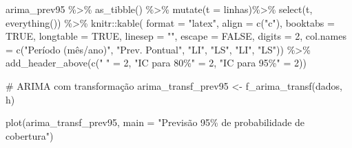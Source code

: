 \documentclass[
  letterpaper,
  DIV=11,
  numbers=noendperiod]{scrartcl}
\newenvironment{Shaded}{\begin{snugshade}}{\end{snugshade}}
\newcommand{\AttributeTok}[1]{\textcolor[rgb]{0.40,0.45,0.13}{#1}}
\newcommand{\CommentTok}[1]{\textcolor[rgb]{0.37,0.37,0.37}{#1}}
\newcommand{\ConstantTok}[1]{\textcolor[rgb]{0.56,0.35,0.01}{#1}}
\newcommand{\DecValTok}[1]{\textcolor[rgb]{0.68,0.00,0.00}{#1}}
\newcommand{\FunctionTok}[1]{\textcolor[rgb]{0.28,0.35,0.67}{#1}}
\newcommand{\NormalTok}[1]{\textcolor[rgb]{0.00,0.23,0.31}{#1}}
\newcommand{\OtherTok}[1]{\textcolor[rgb]{0.00,0.23,0.31}{#1}}
\newcommand{\SpecialCharTok}[1]{\textcolor[rgb]{0.37,0.37,0.37}{#1}}
\newcommand{\StringTok}[1]{\textcolor[rgb]{0.13,0.47,0.30}{#1}}
\begin{document}
\begin{Shaded}
\begin{Highlighting}[]
\NormalTok{arima\_prev95 }\SpecialCharTok{\%\textgreater{}\%} 
  \FunctionTok{as\_tibble}\NormalTok{() }\SpecialCharTok{\%\textgreater{}\%}
  \FunctionTok{mutate}\NormalTok{(}\AttributeTok{t =}\NormalTok{ linhas)}\SpecialCharTok{\%\textgreater{}\%}
  \FunctionTok{select}\NormalTok{(t, }\FunctionTok{everything}\NormalTok{()) }\SpecialCharTok{\%\textgreater{}\%}
\NormalTok{  knitr}\SpecialCharTok{::}\FunctionTok{kable}\NormalTok{(}
      \AttributeTok{format =} \StringTok{"latex"}\NormalTok{,}
      \AttributeTok{align =} \FunctionTok{c}\NormalTok{(}\StringTok{"c"}\NormalTok{),}
      \AttributeTok{booktabs =} \ConstantTok{TRUE}\NormalTok{,}
      \AttributeTok{longtable =} \ConstantTok{TRUE}\NormalTok{,}
      \AttributeTok{linesep =} \StringTok{""}\NormalTok{,}
      \AttributeTok{escape =} \ConstantTok{FALSE}\NormalTok{,}
      \AttributeTok{digits =} \DecValTok{2}\NormalTok{,}
      \AttributeTok{col.names =} \FunctionTok{c}\NormalTok{(}\StringTok{"Período (mês/ano)"}\NormalTok{, }\StringTok{"Prev. Pontual"}\NormalTok{, }\StringTok{"LI"}\NormalTok{, }\StringTok{"LS"}\NormalTok{, }\StringTok{"LI"}\NormalTok{, }\StringTok{"LS"}\NormalTok{)) }\SpecialCharTok{\%\textgreater{}\%}
    \FunctionTok{add\_header\_above}\NormalTok{(}\FunctionTok{c}\NormalTok{(}\StringTok{" "} \OtherTok{=} \DecValTok{2}\NormalTok{, }\StringTok{"IC para 80\%"} \OtherTok{=} \DecValTok{2}\NormalTok{, }\StringTok{"IC para 95\%"} \OtherTok{=} \DecValTok{2}\NormalTok{))}


\CommentTok{\# ARIMA com transformação}
\NormalTok{arima\_transf\_prev95 }\OtherTok{\textless{}{-}} \FunctionTok{f\_arima\_transf}\NormalTok{(dados, h)}

\FunctionTok{plot}\NormalTok{(arima\_transf\_prev95, }\AttributeTok{main =} \StringTok{"Previsão 95\% de probabilidade de cobertura"}\NormalTok{)}


\end{Highlighting}
\end{Shaded}
\end{document}
